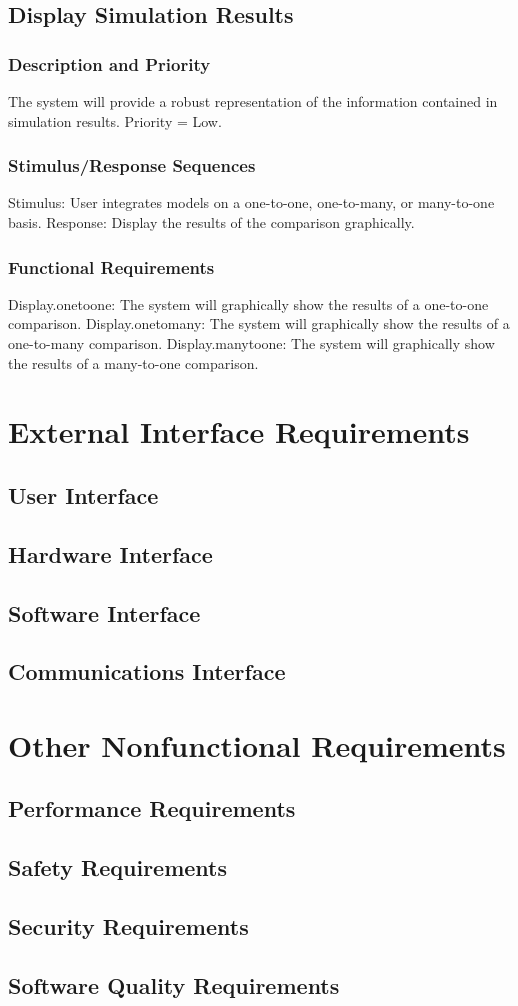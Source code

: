 \documentclass{article}
\begin{document}
\subsection{Display Simulation Results}

\subsubsection{Description and Priority}
The system will provide a robust representation of the information contained in simulation results.  Priority = Low.

\subsubsection{Stimulus/Response Sequences}

Stimulus: User integrates models on a one-to-one, one-to-many, or many-to-one basis.
Response: Display the results of the comparison graphically.

\subsubsection{Functional Requirements}

Display.onetoone: The system will graphically show the results of a one-to-one comparison.
Display.onetomany: The system will graphically show the results of a one-to-many comparison.
Display.manytoone: The system will graphically show the results of a many-to-one comparison.


\section{External Interface Requirements}
\subsection{User Interface}
\subsection{Hardware Interface}
\subsection{Software Interface}
\subsection{Communications Interface}

\section{Other Nonfunctional Requirements}
\subsection{Performance Requirements}
\subsection{Safety Requirements}
\subsection{Security Requirements}
\subsection{Software Quality Requirements}
\end{document}
